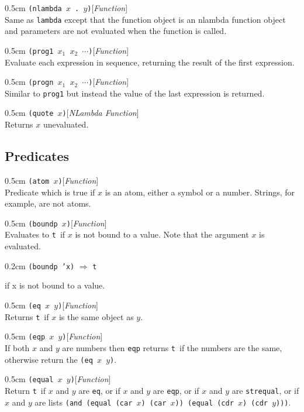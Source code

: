 \documentclass[a4paper]{article}
\newcommand{\lisp}[1]{\texttt{#1}}
\newcommand{\T}{\lisp{t}}
\newcommand{\xargs}{$x_{1}$ $x_{2}$ $\cdots$}
\newenvironment{defun}[2]{\begin{adjustwidth}{0.5cm}{}
    {\hspace*{-0.5cm}\lisp{#2}\hfill[\textit{#1}]\\}}
               {\end{adjustwidth}}
\newcommand{\example}[2]{
  \begin{adjustwidth}{0.2cm}{}
    \lisp{#1} $\Rightarrow$ \lisp{#2}
  \end{adjustwidth}
}
\begin{document}
\begin{defun}{Function}{(nlambda $x$ .\ $y$)}
  Same as \lisp{lambda} except that the function object is an nlambda
  function object and parameters are not evaluated when the function
  is called.
\end{defun}

\begin{defun}{Function}{(prog1 \xargs)}
  Evaluate each expression in sequence, returning the result of the
  first expression.
\end{defun}

\begin{defun}{Function}{(progn \xargs)}
  Similar to \lisp{prog1} but instead the value of the last expression
  is returned.
\end{defun}


\begin{defun}{NLambda Function}{(quote $x$)}
  Returns $x$ unevaluated.
\end{defun}

\subsection{Predicates}

\begin{defun}{Function}{(atom $x$)}
  Predicate which is true if $x$ is an atom, either a symbol or a
  number. Strings, for example, are not atoms.
\end{defun}

\begin{defun}{Function}{(boundp $x$)}
  Evaluates to \T\ if $x$ is not bound to a value. Note that the
  argument $x$ is evaluated.

  \example{(boundp 'x)}{\T}

  if x is not bound to a value.
\end{defun}

\begin{defun}{Function}{(eq $x$ $y$)}
  Returns \T\ if $x$ is the same object as $y$.
\end{defun}

\begin{defun}{Function}{(eqp $x$ $y$)}
  If both $x$ and $y$ are numbers then \lisp{eqp} returns \T\ if the
  numbers are the same, otherwise return the \lisp{(eq $x$ $y$)}.
\end{defun}

\begin{defun}{Function}{(equal $x$ $y$)}
  Return \T\ if $x$ and $y$ are \lisp{eq}, or if $x$ and $y$ are
  \lisp{eqp}, or if $x$ and $y$ are \lisp{strequal}, or if $x$ and $y$
  are lists \lisp{(and (equal (car $x$) (car $x$)) (equal (cdr $x$)
    (cdr $y$)))}.
\end{defun}
\end{document}
